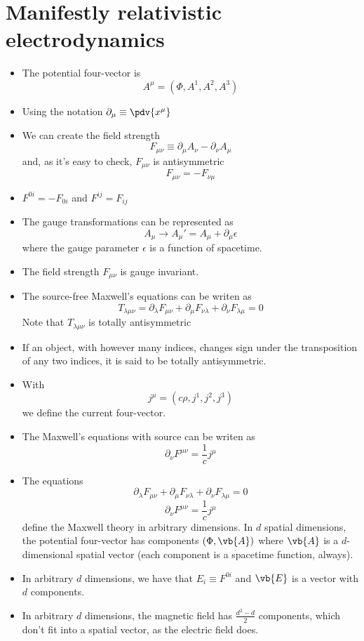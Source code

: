 \documentclass[12pt]{report}
\begin{document}
\section{Manifestly relativistic electrodynamics}
\begin{itemize}
    \item The potential four-vector is $$A^{\mu } = (\Phi, A^1, A^2, A^3)$$
    \item Using the notation $\partial _{\mu} \equiv \pdv{x^{\mu }}$
    \item We can create the field strength
    $$F_{\mu \nu } \equiv \partial_ \mu A_{\nu } - \partial _ \nu A_ {\mu }$$
    and, as it's easy to check, $F_{\mu \nu}$ is antisymmetric
    $$F_{\mu \nu } = - F_{\nu \mu }$$
    \item $F^{0i} = -F_{0i}$ and $F^{ij} = F_{ij}$
    \item The gauge transformations can be represented as 
    $$A_{\mu} \longrightarrow A_{\mu}' = A_{\mu}+ \partial_{\mu}\epsilon$$
    where the gauge parameter $\epsilon$ is a function of spacetime.
    \item The field strength $F_{\mu \nu}$ is  gauge invariant.
    \item The source-free Maxwell's equations can be writen as $$T_{\lambda \mu \nu} = \partial_{\lambda}F_{\mu \nu} + \partial_{\mu}F_{\nu \lambda} + \partial_{\nu}F_{\lambda \mu} = 0$$
    Note that $T_{\lambda \mu \nu}$ is totally antisymmetric
    \item If an object, with however many indices, changes sign under the transposition of any two indices, it is said to be totally antisymmetric.
    \item With
    $$j^{\mu} = (c\rho, j^1, j^2, j^3)$$
    we define the current four-vector.
    \item The Maxwell's equations with source can be writen as 
    $$\partial_ {\nu }{F^{\mu \nu }} = \frac{1}{c}j^{\mu}$$
    \item The equations 
    $$\partial_{\lambda}F_{\mu \nu} + \partial_{\mu}F_{\nu \lambda} + \partial_{\nu}F_{\lambda \mu} = 0$$
    $$\partial_ {\nu }{F^{\mu \nu }} = \frac{1}{c}j^{\mu}$$
    define the Maxwell theory in arbitrary dimensions. In $d$ spatial dimensions, the potential four-vector has components $(\Phi, \vb{A})$ where $\vb{A}$ is a $d$-dimensional spatial vector (each component is a spacetime function, always). \item In arbitrary $d$ dimensions, we have that $E_i \equiv F^{0i}$ and $\vb{E}$ is a vector with $d$ components.
    \item In arbitrary $d$ dimensions, the magnetic field has $\frac{d^2 - d}{2}$ components, which don't fit into a spatial vector, as the electric field does.
\end{itemize}
\end{document}
